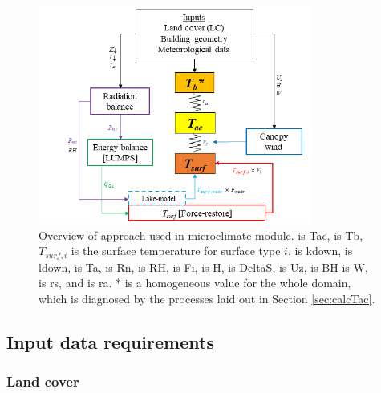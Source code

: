 \documentclass[final,3p,times,authoryear]{elsarticle}
\begin{document}
\begin{figure}[!htbp]
\begin{center}

\includegraphics[width=0.8\textwidth,keepaspectratio]{figure1.png}

 \caption{Overview of approach used in  microclimate module.  is \glsdesc{Tac},  is \glsdesc{Tb}, $T_{surf,i}$ is the surface temperature for surface type $i$,  is \glsdesc{kdown},  is \glsdesc{ldown},  is \glsdesc{Ta},  is \glsdesc{Rn},  is \glsdesc{RH},  is \glsdesc{Fi},  is \glsdesc{H},  is \glsdesc{DeltaS},  is \glsdesc{Uz},  is \glsdesc{BH}   is \glsdesc{W},  is \glsdesc{rs}, and  is \glsdesc{ra}. * is a homogeneous value for the whole domain, which is diagnosed by the processes laid out in Section \ref{sec:calcTac}.} \label{fig:overview}
 \end{center}

\end{figure}


\subsection{Input data requirements}\label{sec:datainputs}
\subsubsection{Land cover}\label{sec:landcover}
\end{document}
